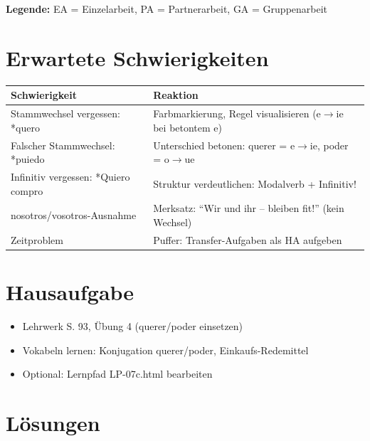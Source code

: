 \documentclass[11pt,a4paper]{article}
\begin{document}
\textbf{Legende:} EA = Einzelarbeit, PA = Partnerarbeit, GA = Gruppenarbeit

\section{Erwartete Schwierigkeiten}

\begin{tabular}{|p{4.5cm}|p{8cm}|}
\hline
\textbf{Schwierigkeit} & \textbf{Reaktion} \\
\hline
Stammwechsel vergessen: *quero & Farbmarkierung, Regel visualisieren (e$\rightarrow$ie bei betontem e) \\
\hline
Falscher Stammwechsel: *puiedo & Unterschied betonen: querer = e$\rightarrow$ie, poder = o$\rightarrow$ue \\
\hline
Infinitiv vergessen: *Quiero compro & Struktur verdeutlichen: Modalverb + Infinitiv! \\
\hline
nosotros/vosotros-Ausnahme & Merksatz: ``Wir und ihr -- bleiben fit!'' (kein Wechsel) \\
\hline
Zeitproblem & Puffer: Transfer-Aufgaben als HA aufgeben \\
\hline
\end{tabular}

\section{Hausaufgabe}

\begin{itemize}
    \item Lehrwerk S. 93, Übung 4 (querer/poder einsetzen)
    \item Vokabeln lernen: Konjugation querer/poder, Einkaufs-Redemittel
    \item Optional: Lernpfad LP-07c.html bearbeiten
\end{itemize}

\section{Lösungen}
\end{document}
